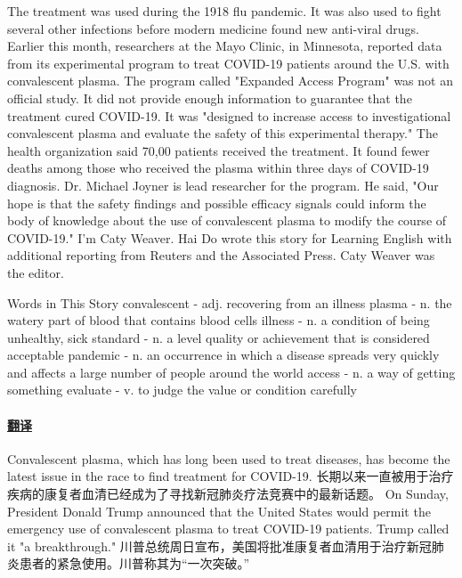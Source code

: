 The treatment was used during the 1918 flu pandemic. It was also used to fight several other infections before modern medicine found new anti-viral drugs.
Earlier this month, researchers at the Mayo Clinic, in Minnesota, reported data from its experimental program to treat COVID-19 patients around the U.S. with convalescent plasma.
The program called "Expanded Access Program" was not an official study. It did not provide enough information to guarantee that the treatment cured COVID-19. It was "designed to increase access to investigational convalescent plasma and evaluate the safety of this experimental therapy."
The health organization said 70,00 patients received the treatment. It found fewer deaths among those who received the plasma within three days of COVID-19 diagnosis.
Dr. Michael Joyner is lead researcher for the program. He said, "Our hope is that the safety findings and possible efficacy signals could inform the body of knowledge about the use of convalescent plasma to modify the course of COVID-19."
I'm Caty Weaver.
Hai Do wrote this story for Learning English with additional reporting from Reuters and the Associated Press. Caty Weaver was the editor.

\begin{messagebox}
Words in This Story
convalescent - adj. recovering from an illness
plasma - n. the watery part of blood that contains blood cells
illness - n. a condition of being unhealthy, sick
standard - n. a level quality or achievement that is considered acceptable
pandemic - n. an occurrence in which a disease spreads very quickly and affects a large number of people around the world
access - n. a way of getting something
evaluate - v. to judge the value or condition carefully
\end{messagebox}

\paragraph{\href{https://www.51voa.com/VOA\_Special\_English/covid--plasma-a-breakthrough-or-an-experiment-85234_1.html}{翻译}}

Convalescent plasma, which has long been used to treat diseases, has become the latest issue in the race to find treatment for COVID-19.
长期以来一直被用于治疗疾病的康复者血清已经成为了寻找新冠肺炎疗法竞赛中的最新话题。
On Sunday, President Donald Trump announced that the United States would permit the emergency use of convalescent plasma to treat COVID-19 patients. Trump called it "a breakthrough."
川普总统周日宣布，美国将批准康复者血清用于治疗新冠肺炎患者的紧急使用。川普称其为“一次突破。”

